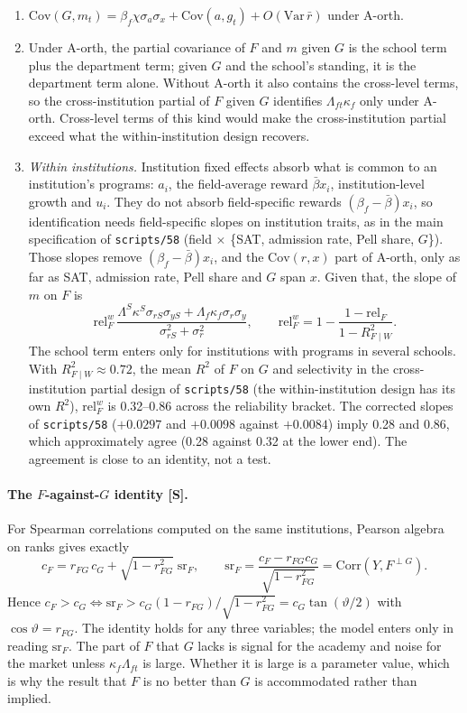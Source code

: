 \documentclass[11pt]{article}
\begin{document}
\begin{enumerate}
\item[(i)] $\mathrm{Cov}(G,m_t)=\beta_f\chi\sigma_a\sigma_x+\mathrm{Cov}(a,g_t)+O(\mathrm{Var}\,\bar r)$ under A-orth.
\item[(ii)] Under A-orth, the partial covariance of $F$ and $m$ given $G$ is the school term plus the department
term; given $G$ and the school's standing, it is the department term alone. Without A-orth it also contains the
cross-level terms, so the cross-institution partial of $F$ given $G$ identifies $\Lambda_{ft}\kappa_f$ only under
A-orth. Cross-level terms of this kind would make the cross-institution partial exceed what the
within-institution design recovers.
\item[(iii)] \emph{Within institutions.} Institution fixed effects absorb what is common to an institution's
programs: $a_i$, the field-average reward $\bar\beta x_i$, institution-level growth and $u_i$. They do not absorb
field-specific rewards $(\beta_f-\bar\beta)x_i$, so identification needs field-specific slopes on institution
traits, as in the main specification of \texttt{scripts/58} (field $\times$ \{SAT, admission rate, Pell share,
$G$\}). Those slopes remove $(\beta_f-\bar\beta)x_i$, and the $\mathrm{Cov}(r,x)$ part of A-orth, only as far as
SAT, admission rate, Pell share and $G$ span $x$. Given that, the slope of $m$ on $F$ is
\[
\mathrm{rel}^w_F\,\frac{\Lambda^S\kappa^S\sigma_{rS}\sigma_{yS}+\Lambda_{f}\kappa_f\sigma_r\sigma_y}{\sigma_{rS}^2+\sigma_r^2},
\qquad \mathrm{rel}^w_F=1-\frac{1-\mathrm{rel}_F}{1-R^2_{F\mid W}} .
\]
The school term enters only for institutions with programs in several schools. With $R^2_{F\mid W}\approx0.72$,
the mean $R^2$ of $F$ on $G$ and selectivity in the cross-institution partial design of \texttt{scripts/58} (the
within-institution design has its own $R^2$), $\mathrm{rel}^w_F$ is 0.32--0.86 across the reliability bracket. The
corrected slopes of \texttt{scripts/58} ($+0.0297$ and $+0.0098$ against $+0.0084$) imply 0.28 and 0.86, which
approximately agree (0.28 against 0.32 at the lower end). The agreement is close to an identity, not a test.
\end{enumerate}

\paragraph{The $F$-against-$G$ identity [S].} For Spearman correlations computed on the same institutions,
Pearson algebra on ranks gives exactly
\[
c_F=r_{FG}\,c_G+\sqrt{1-r_{FG}^2}\;\mathrm{sr}_F,\qquad
\mathrm{sr}_F=\frac{c_F-r_{FG}c_G}{\sqrt{1-r_{FG}^2}}=\mathrm{Corr}(Y,F^{\perp G}) .
\]
Hence $c_F>c_G\iff\mathrm{sr}_F>c_G(1-r_{FG})/\sqrt{1-r_{FG}^2}=c_G\tan(\vartheta/2)$ with
$\cos\vartheta=r_{FG}$. The identity holds for any three variables; the model enters only in reading
$\mathrm{sr}_F$. The part of $F$ that $G$ lacks is signal for the academy and noise for the market unless
$\kappa_f\Lambda_{ft}$ is large. Whether it is large is a parameter value, which is why the result that $F$ is no
better than $G$ is accommodated rather than implied.
\end{document}

